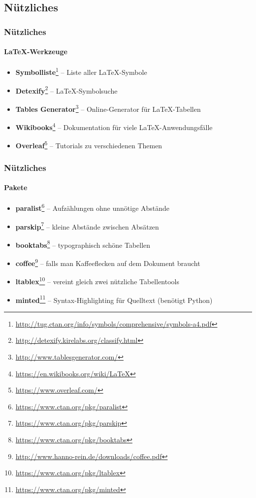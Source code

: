 

\subsection*{Nützliches}

\begin{frame}
\frametitle{Nützliches}
\framesubtitle{LaTeX-Werkzeuge}
\begin{itemize}
  \item \textbf{Symbolliste}\footnote{\url{http://tug.ctan.org/info/symbols/comprehensive/symbols-a4.pdf}} -- Liste aller \LaTeX -Symbole \\
  \item \textbf{Detexify}\footnote{\url{http://detexify.kirelabs.org/classify.html}} -- \LaTeX -Symbolsuche\\
  \item \textbf{Tables Generator}\footnote{\url{http://www.tablesgenerator.com/}} -- Online-Generator für \LaTeX -Tabellen  \\
  \item \textbf{Wikibooks}\footnote{\url{https://en.wikibooks.org/wiki/LaTeX}} -- Dokumentation für viele \LaTeX -Anwendungsfälle \\
  \item \textbf{Overleaf}\footnote{\url{https://www.overleaf.com/}} -- Tutorials zu verschiedenen Themen \\
\end{itemize}
\end{frame}


\begin{frame}
\frametitle{Nützliches}
\framesubtitle{Pakete}
\begin{itemize}
  \item \textbf{paralist}\footnote{\url{https://www.ctan.org/pkg/paralist}} -- Aufzählungen ohne unnötige Abstände \\
  \item \textbf{parskip}\footnote{\url{https://www.ctan.org/pkg/parskip}} -- kleine Abstände zwischen Absätzen \\
  \item \textbf{booktabs}\footnote{\url{https://www.ctan.org/pkg/booktabs}} -- typographisch schöne Tabellen \\
  \item \textbf{coffee}\footnote{\url{http://www.hanno-rein.de/downloads/coffee.pdf}} -- falls man Kaffeeflecken auf dem Dokument braucht \\
  \item \textbf{ltablex}\footnote{\url{https://www.ctan.org/pkg/ltablex}} -- vereint gleich zwei nützliche Tabellentools \\
  \item \textbf{minted}\footnote{\url{https://www.ctan.org/pkg/minted}} -- Syntax-Highlighting für Quelltext (benötigt Python) \\
\end{itemize}
\end{frame}

